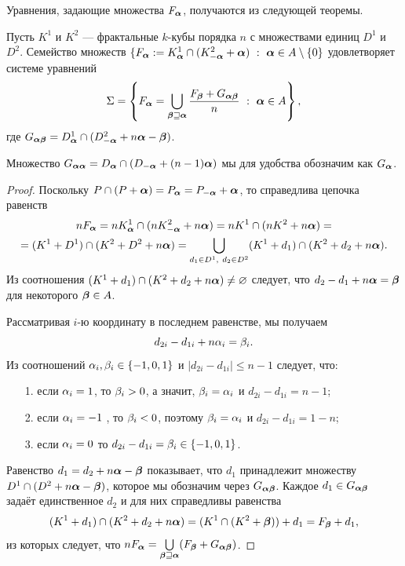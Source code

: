 Уравнения, задающие множества $F_{\bm{\alpha}}$, получаются из следующей теоремы.

\begin{theorem}\label{IFC}
Пусть $K^1$ и $K^2$ --- фрактальные $k$-кубы порядка $n$ с множествами единиц $D^1$ и $D^2$.
Семейство множеств $\{F_\bma:=K^1_{\bma}\cap(K^2_{-\bma}+\bma)\ :\ \bma\in A\mmm\{0\}$ удовлетворяет системе уравнений
\begin{equation}\label{sideint}
\Sigma=\left\{
F_{\bm{\alpha}}=\bigcup\limits_{{\bm{\beta}}\sqsupseteq{\bm{\alpha}}} \dfrac{F_{\bm{\beta}}+G_{{\bm{\alpha}}{\bm{\beta}}}}{n}\ :\ {\bm{\alpha}}\in A\right\},
\end{equation}
где $G_{{\bm{\alpha}}{\bm{\beta}}}=D^1_{\bm{\alpha}}\cap(D^2_{-{\bm{\alpha}}}+n{\bm{\alpha}}-{\bm{\beta}})$.
\end{theorem}

Множество $G_{{\bm{\alpha}}{\bm{\alpha}}}=D_{\bm{\alpha}}\cap(D_{-{\bm{\alpha}}}+(n-1){\bm{\alpha}})$ мы для удобства обозначим как $G_{{\bm{\alpha}}}$.

\begin{proof}
Поскольку $P\cap (P+{\bm{\alpha}})=P_{\bm{\alpha}}=P_{-{\bm{\alpha}}}+{\bm{\alpha}}$, то справедлива цепочка равенств
\begin{multline}\label{line}
nF_{\bm{\alpha}}=nK^1_{\bm{\alpha}}\cap (nK^2_{-{\bm{\alpha}}}+n{\bm{\alpha}})=nK^1\cap(nK^2+n{\bm{\alpha}})=\\
=(K^1+D^1)\cap(K^2+D^2+n{\bm{\alpha}})=
\bigcup\limits_{d_1\in D^1,\ d_2\in D^2}(K^1+d_1)\cap (K^2+d_2+n{\bm{\alpha}}).
\end{multline}
Из соотношения $(K^1+d_1)\cap (K^2+d_2+n{\bm{\alpha}})\neq\varnothing$ следует, что $d_2-d_1+n{\bm{\alpha}}={\bm{\beta}}$ для некоторого ${\bm{\beta}}\in A$.

Рассматривая $i$-ю координату в последнем равенстве, мы получаем
$$d_{2i}-d_{1i}+n\alpha_i=\beta_i.$$ 
Из соотношений $\alpha_i,\beta_i\in\{-1,0,1\}$ и $|d_{2i}-d_{1i}|\le n-1$ следует, что: \medskip
\begin{itemize}[nolistsep]
 \item[1.] если $\alpha_i=1$, то $\beta_i>0$, а значит, $\beta_i=\alpha_i$ и $d_{2i}-d_{1i}=n-1$;
 \item[2.] если $\alpha_i=-1$ , то $\beta_i<0$, поэтому $\beta_i=\alpha_i$ и $d_{2i}-d_{1i}=1-n$;
 \item[3.] если $\alpha_i=0$ то $d_{2i}-d_{1i}=\beta_i\in\{-1,0,1\}$.
\end{itemize} 
\medskip

Равенство $d_1=d_2+n{\bm{\alpha}}-{\bm{\beta}}$ показывает, что $d_1$ принадлежит множеству $D^1\cap(D^2+n{\bm{\alpha}}-{\bm{\beta}})$, которое мы обозначим через $G_{{\bm{\alpha}}{\bm{\beta}}}$.
Каждое $d_1\in G_{{\bm{\alpha}}{\bm{\beta}}}$ задаёт единственное $d_2$ и для них справедливы равенства 
$$(K^1+d_1)\cap (K^2+d_2+n{\bm{\alpha}})= (K^1\cap(K^2+{\bm{\beta}}))+d_1= F_{\bm{\beta}}+d_1,$$ 
из которых следует, что $nF_{\bm{\alpha}}= \bigcup\limits_{{\bm{\beta}}\sqsupseteq{\bm{\alpha}}} (F_{\bm{\beta}}+G_{{\bm{\alpha}}{\bm{\beta}}})$.
\end{proof}

